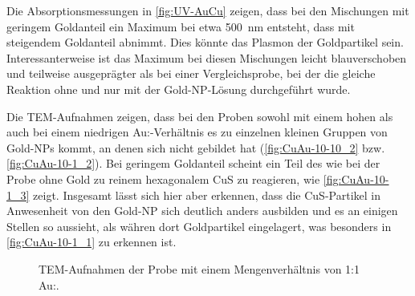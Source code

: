 	Die Absorptionsmessungen in \cref{fig:UV-AuCu} zeigen, dass bei den Mischungen mit geringem Goldanteil ein Maximum bei etwa \SI{500}{\nano\meter} entsteht, dass mit steigendem Goldanteil abnimmt.
	Dies könnte das Plasmon der Goldpartikel sein.
	Interessanterweise ist das Maximum bei diesen Mischungen leicht blauverschoben und teilweise ausgeprägter als bei einer Vergleichsprobe, bei der die gleiche Reaktion ohne  und nur mit der Gold-NP-Lösung durchgeführt wurde.
	
	Die TEM-Aufnahmen zeigen, dass bei den Proben sowohl mit einem hohen als auch bei einem niedrigen Au:-Verhältnis es zu einzelnen kleinen Gruppen von Gold-NPs kommt, an denen sich nicht gebildet hat (\cref{fig:CuAu-10-10_2} bzw. \cref{fig:CuAu-10-1_2}).
	Bei geringem Goldanteil scheint ein Teil des  wie bei der Probe ohne Gold zu reinem hexagonalem CuS zu reagieren, wie \cref{fig:CuAu-10-1_3} zeigt.
	Insgesamt lässt sich hier aber erkennen, dass die CuS-Partikel in Anwesenheit von den Gold-NP sich deutlich anders ausbilden und es an einigen Stellen so aussieht, als währen dort Goldpartikel eingelagert, was besonders in \cref{fig:CuAu-10-1_1} zu erkennen ist.
	
	\begin{figure}[htbp]
		\centering
		\caption{TEM-Aufnahmen der Probe mit einem Mengenverhältnis von 1:1 Au:.}
		\label{fig:TEM-CuAu-10-10}
	\end{figure}
	
